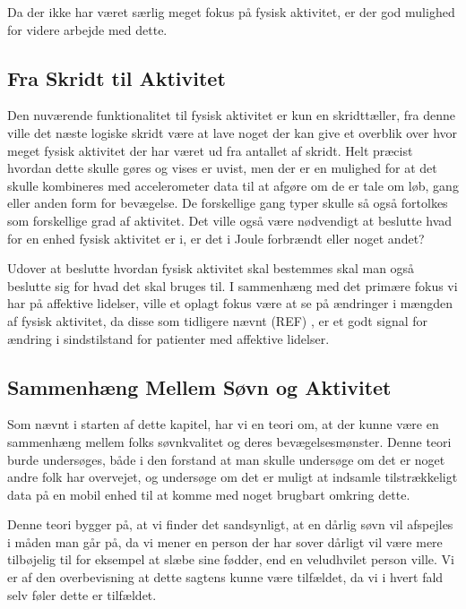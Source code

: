 Da der ikke har været særlig meget fokus på fysisk aktivitet, er der god mulighed for videre arbejde med dette.

\subsection{Fra Skridt til Aktivitet}
Den nuværende funktionalitet til fysisk aktivitet er kun en skridttæller, fra denne ville det næste logiske skridt være at lave noget der kan give et overblik over hvor meget fysisk aktivitet der har været ud fra antallet af skridt.
Helt præcist hvordan dette skulle gøres og vises er uvist, men der er en mulighed for at det skulle kombineres med accelerometer data til at afgøre om de er tale om løb, gang eller anden form for bevægelse.
De forskellige gang typer skulle så også fortolkes som forskellige grad af aktivitet. 
Det ville også være nødvendigt at beslutte hvad for en enhed fysisk aktivitet er i, er det i Joule forbrændt eller noget andet?

Udover at beslutte hvordan fysisk aktivitet skal bestemmes skal man også beslutte sig for hvad det skal bruges til.
I sammenhæng med det primære fokus vi har på affektive lidelser, ville et oplagt fokus være at se på ændringer i mængden af fysisk aktivitet, da disse som tidligere nævnt (REF) , er et godt signal for ændring i sindstilstand for patienter med affektive lidelser.

\subsection{Sammenhæng Mellem Søvn og Aktivitet}
Som nævnt i starten af dette kapitel, har vi en teori om, at der kunne være en sammenhæng mellem folks søvnkvalitet og deres bevægelsesmønster.
Denne teori burde undersøges, både i den forstand at man skulle undersøge om det er noget andre folk har overvejet, og undersøge om det er muligt at indsamle tilstrækkeligt data på en mobil enhed til at komme med noget brugbart omkring dette.

Denne teori bygger på, at vi finder det sandsynligt, at en dårlig søvn vil afspejles i måden man går på, da vi mener en person der har sover dårligt vil være mere tilbøjelig til for eksempel at slæbe sine fødder, end en veludhvilet person ville.
Vi er af den overbevisning at dette sagtens kunne være tilfældet, da vi i hvert fald selv føler dette er tilfældet.

